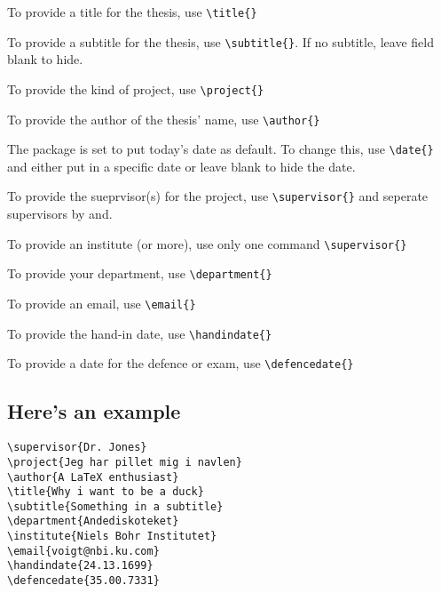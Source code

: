 \begin{compactitem}[-]
\item To provide a title for the thesis, use
\verb|\title{}|
\item To provide a subtitle for the thesis, use
\verb|\subtitle{}|. If no subtitle, leave field blank to hide.
\item To provide the kind of project, use
\verb|\project{}|
\item To provide the author of the thesis' name, use \verb|\author{}|
\item The package is set to put today's date as default. To change this, use \verb|\date{}| and either put in a specific date or leave blank to hide the date.
\item To provide the sueprvisor(s) for the project, use \verb|\supervisor{}| and seperate supervisors by and.
\item To provide an institute (or more), use only one command \verb|\supervisor{}|
\item To provide your department, use \verb|\department{}|
\item To provide an email, use \verb|\email{}|
\item To provide the hand-in date, use \verb|\handindate{}|
\item To provide a date for the defence or exam, use \verb|\defencedate{}|
\end{compactitem}

\subsection*{Here's an example}

\noindent \verb|\supervisor{Dr. Jones}|\\
\verb|\project{Jeg har pillet mig i navlen}|\\
\verb|\author{A LaTeX enthusiast}|\\
\verb|\title{Why i want to be a duck}|\\
\verb|\subtitle{Something in a subtitle}|\\
\verb|\department{Andediskoteket}|\\
\verb|\institute{Niels Bohr Institutet}|\\
\verb|\email{voigt@nbi.ku.com}|\\
\verb|\handindate{24.13.1699}|\\
\verb|\defencedate{35.00.7331}|\\

